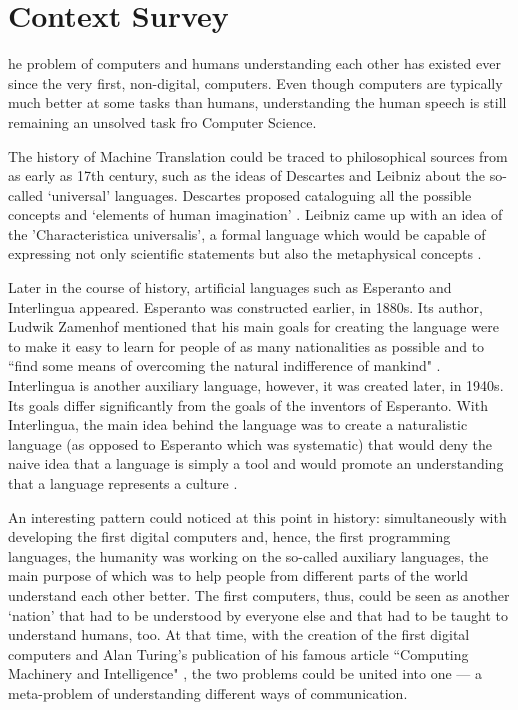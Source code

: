 \let\textcircled=\pgftextcircled
\chapter{Context Survey}
\label{chap:context-survey}

he problem of computers and humans understanding each other has existed ever since the very first, non-digital, computers. Even though computers are typically much better at some tasks than humans, understanding the human speech is still remaining an unsolved task fro Computer Science. 

The history of Machine Translation could be traced to philosophical sources from as early as 17th century, such as the ideas of Descartes and Leibniz about the so-called `universal' languages. Descartes proposed cataloguing all the possible concepts and `elements of human imagination' \cite{descartes}. Leibniz came up with an idea of the 'Characteristica universalis', a formal language which would be capable of expressing not only scientific statements but also the metaphysical concepts \cite{leibniz}. 

Later in the course of history, artificial languages such as Esperanto and Interlingua appeared. Esperanto was constructed earlier, in 1880s. Its author, Ludwik Zamenhof mentioned that his main goals for creating the language were to make it easy to learn for people of as many nationalities as possible and to ``find some means of overcoming the natural indifference of mankind" \cite{zamenhof1911international}. Interlingua is another auxiliary language, however, it was created later, in 1940s. Its goals differ significantly from the goals of the inventors of Esperanto. With Interlingua, the main idea behind the language was to create a naturalistic language (as opposed to Esperanto which was systematic) that would deny the naive idea that a language is simply a tool and would promote an understanding that a language represents a culture \cite{gode1951interlingua}.

An interesting pattern could noticed at this point in history: simultaneously with developing the first digital computers and, hence, the first programming languages, the humanity was working on the so-called auxiliary languages, the main purpose of which was to help people from different parts of the world understand each other better. The first computers, thus, could be seen as another `nation' that had to be understood by everyone else and that had to be taught to understand humans, too. At that time, with the creation of the first digital computers and Alan Turing's publication of his famous article ``Computing Machinery and Intelligence" \cite{turing1950computing}, the two problems could be united into one --- a meta-problem of understanding different ways of communication.

